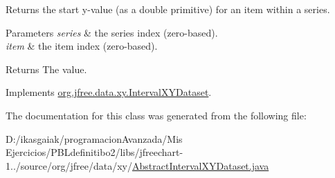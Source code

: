 Returns the start y-\/value (as a double primitive) for an item within a series.


\begin{DoxyParams}{Parameters}
{\em series} & the series index (zero-\/based). \\
\hline
{\em item} & the item index (zero-\/based).\\
\hline
\end{DoxyParams}
\begin{DoxyReturn}{Returns}
The value. 
\end{DoxyReturn}


Implements \mbox{\hyperlink{interfaceorg_1_1jfree_1_1data_1_1xy_1_1_interval_x_y_dataset_aed1acf6e36561ce5acc3f6811a2ecef9}{org.\+jfree.\+data.\+xy.\+Interval\+X\+Y\+Dataset}}.



The documentation for this class was generated from the following file\+:\begin{DoxyCompactItemize}
\item 
D\+:/ikasgaiak/programacion\+Avanzada/\+Mis Ejercicios/\+P\+B\+Ldefinitibo2/libs/jfreechart-\/1../source/org/jfree/data/xy/\mbox{\hyperlink{_abstract_interval_x_y_dataset_8java}{Abstract\+Interval\+X\+Y\+Dataset.\+java}}\end{DoxyCompactItemize}
